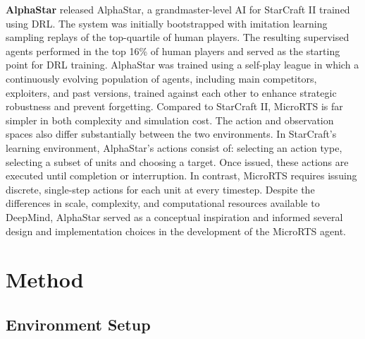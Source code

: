 \documentclass[10pt,twocolumn,letterpaper]{article}
\begin{document}
\noindent\textbf{AlphaStar}
\cite{vinyals2019sc2} released AlphaStar, a grandmaster-level AI for StarCraft II trained using DRL. The system was initially bootstrapped with imitation learning sampling replays of the top-quartile of human players. The resulting supervised agents performed in the top 16\% of human players and served as the starting point for DRL training. AlphaStar was trained using a self-play league in which a continuously evolving population of agents, including main competitors, exploiters, and past versions, trained against each other to enhance strategic robustness and prevent forgetting.
Compared to StarCraft II, MicroRTS is far simpler in both complexity and simulation cost. The action and observation spaces also differ substantially between the two environments. In StarCraft’s learning environment, AlphaStar’s actions consist of: selecting an action type, selecting a subset of units and  choosing a target. Once issued, these actions are executed until completion or interruption. In contrast, MicroRTS  requires issuing discrete, single-step actions for each unit at every timestep.
Despite the differences in scale, complexity, and computational resources available to DeepMind, AlphaStar served as a conceptual inspiration and informed several design and implementation choices in the development of the MicroRTS agent.




\section{Method}
\label{sec:method}

\subsection{Environment Setup}
\label{sec:env-setup}
\end{document}
